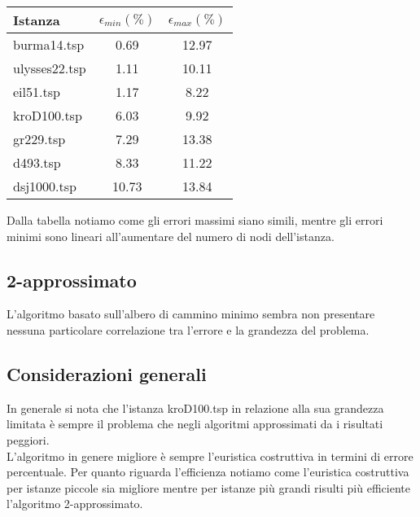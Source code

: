 \documentclass{article}
\begin{document}
\begin{table}[H]
	\begin{tabular}{lcc}
		\toprule
		Istanza       & $\epsilon_{min}(\%)$ & $\epsilon_{max}(\%)$ \\
		\midrule
		burma14.tsp   & 0.69                 & 12.97                \\
		ulysses22.tsp & 1.11                 & 10.11                \\
		eil51.tsp     & 1.17                 & 8.22                 \\
		kroD100.tsp   & 6.03                 & 9.92                 \\
		gr229.tsp     & 7.29                 & 13.38                \\
		d493.tsp      & 8.33                 & 11.22                \\
		dsj1000.tsp   & 10.73                & 13.84                \\
		\bottomrule
	\end{tabular}
\end{table}

\noindent Dalla tabella notiamo come gli errori massimi siano simili, mentre gli errori minimi sono lineari all'aumentare del numero di nodi dell'istanza.

\subsection*{2-approssimato}
L'algoritmo basato sull'albero di cammino minimo sembra non presentare nessuna particolare correlazione tra l'errore e la grandezza del problema.

\subsection*{Considerazioni generali}
In generale si nota che l'istanza kroD100.tsp in relazione alla sua grandezza limitata è sempre il problema che negli algoritmi approssimati da i risultati peggiori.\\
L'algoritmo in genere migliore è sempre l'euristica costruttiva in termini di errore percentuale. Per quanto riguarda l'efficienza notiamo come l'euristica costruttiva per istanze piccole sia migliore mentre per istanze più grandi risulti più efficiente l'algoritmo 2-approssimato.
\end{document}
